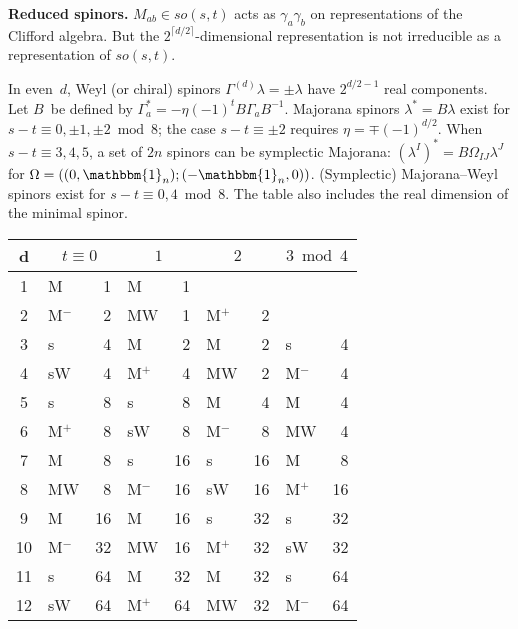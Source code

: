 \documentclass[10pt,letterpaper]{article}
\def\myparagraph #1{\textbf{#1}}
\begin{document}
\myparagraph{Reduced spinors.}
$M_{ab}\in so(s,t)$ acts as $\gamma_a \gamma_b$ on representations of the Clifford algebra.
But the $2^{\lceil d/2\rceil}$-dimensional representation is not irreducible as a representation of $so(s,t)$.

In even~$d$, Weyl (or chiral) spinors $\Gamma^{(d)}\lambda=\pm\lambda$ have $2^{d/2-1}$ real components.
Let $B$~be defined by $\Gamma_a^*=-\eta(-1)^t B\Gamma_a B^{-1}$.
Majorana spinors $\lambda^*=B\lambda$ exist for $s-t\equiv 0,\pm 1,\pm 2\bmod{8}$;
the case $s-t\equiv\pm 2$ requires $\eta=\mp (-1)^{d/2}$.
When $s-t\equiv 3,4,5$, a set of $2n$ spinors can be symplectic Majorana: $(\lambda^I)^*=B\Omega_{IJ}\lambda^J$ for $\Omega=((0,\mathbbm{1}_n);(-\mathbbm{1}_n,0))$.
(Symplectic) Majorana--Weyl spinors exist for $s-t\equiv 0,4\bmod{8}$.
The table also includes the real dimension of the minimal spinor.
\begin{center}
\vspace{-.5\baselineskip}
\begin{tabular}{c*{4}{>{ }l@{ }r<{ }}}\toprule
d &\multicolumn{2}{c}{$t\equiv 0$} &\multicolumn{2}{c}{$1$}
& \multicolumn{2}{c}{$2$} & \multicolumn{2}{c}{$3\bmod{4}$} \\ \midrule
1 & M     & 1 & M    & 1 &       &   & &   \\
2 & M$^-$ & 2 & MW   & 1 & M$^+$ & 2 & &   \\
3 & s     & 4 & M    & 2 & M     & 2 & s     & 4 \\
4 & sW    & 4 & M$^+$& 4 & MW    & 2 & M$^-$ & 4 \\
5 & s     & 8 & s    & 8 & M     & 4 & M     & 4 \\
6 & M$^+$ & 8 & sW   & 8 & M$^-$ & 8 & MW    & 4 \\
7 & M     & 8 & s    & 16 & s    & 16 & M    & 8 \\
8 & MW    & 8 & M$^-$& 16 & sW   & 16 & M$^+$& 16 \\
9 & M     & 16& M    & 16 & s    & 32 & s    & 32 \\
10& M$^-$ & 32& MW   & 16 & M$^+$& 32 & sW   & 32 \\
11& s     & 64& M    & 32 & M    & 32 & s    & 64 \\
12& sW    & 64& M$^+$& 64 & MW   & 32 & M$^-$ & 64\\\bottomrule
\end{tabular}
\end{center}
\end{document}
